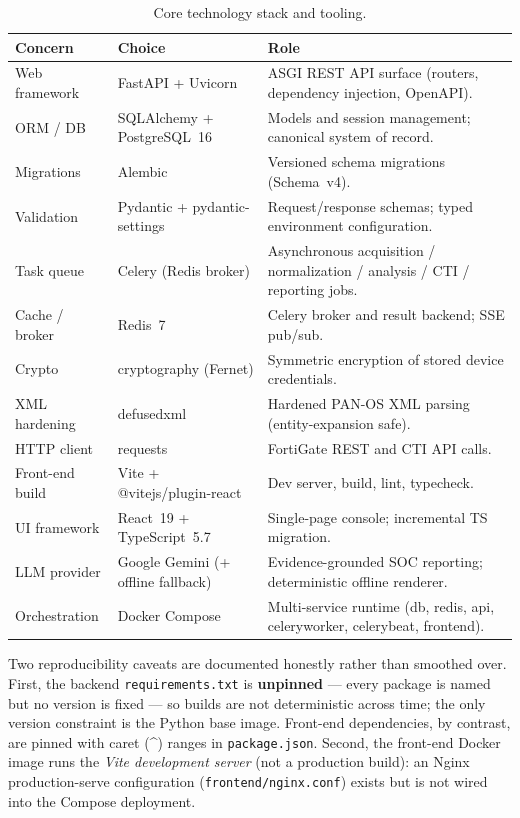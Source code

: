 \documentclass[12pt,a4paper]{report}
\renewcommand{\_}{\textunderscore\allowbreak}
\newcommand{\hcell}[1]{\textbf{#1}}
\begin{document}
\begin{table}[!ht]
\centering
\caption{Core technology stack and tooling.}
\label{tab:ch4-stack}
\small
\begin{tabular}{L{3.0cm}L{4.0cm}L{6.4cm}}
\hline
\hcell{Concern} & \hcell{Choice} & \hcell{Role} \\
\hline
Web framework & FastAPI + Uvicorn & ASGI REST API surface (routers, dependency injection, OpenAPI). \\
ORM / DB & SQLAlchemy + PostgreSQL~16 & Models and session management; canonical system of record. \\
Migrations & Alembic & Versioned schema migrations (Schema~v4). \\
Validation & Pydantic + pydantic-settings & Request/response schemas; typed environment configuration. \\
Task queue & Celery (Redis broker) & Asynchronous acquisition / normalization / analysis / CTI / reporting jobs. \\
Cache / broker & Redis~7 & Celery broker and result backend; SSE pub/sub. \\
Crypto & cryptography (Fernet) & Symmetric encryption of stored device credentials. \\
XML hardening & defusedxml & Hardened PAN-OS XML parsing (entity-expansion safe). \\
HTTP client & requests & FortiGate REST and CTI API calls. \\
Front-end build & Vite + @vitejs/plugin-react & Dev server, build, lint, typecheck. \\
UI framework & React~19 + TypeScript~5.7 & Single-page console; incremental TS migration. \\
LLM provider & Google Gemini (+ offline fallback) & Evidence-grounded SOC reporting; deterministic offline renderer. \\
Orchestration & Docker Compose & Multi-service runtime (db, redis, api, celery\_worker, celery\_beat, frontend). \\
\hline
\end{tabular}
\end{table}

Two reproducibility caveats are documented honestly rather than smoothed over. First, the backend \texttt{requirements.txt} is \textbf{unpinned} --- every package is named but no version is fixed --- so builds are not deterministic across time; the only version constraint is the Python base image. Front-end dependencies, by contrast, are pinned with caret (\textasciicircum{}) ranges in \texttt{package.json}. Second, the front-end Docker image runs the \emph{Vite development server} (not a production build): an Nginx production-serve configuration (\texttt{frontend/nginx.conf}) exists but is not wired into the Compose deployment.
\end{document}
